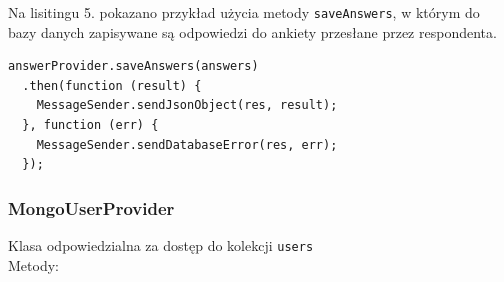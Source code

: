 \documentclass[8pt,a4paper,notitlepage]{article}
\begin{document}
\par Na lisitingu 5. pokazano przykład użycia metody \texttt{saveAnswers}, w którym do bazy danych zapisywane są odpowiedzi do ankiety przesłane przez respondenta.

\begin{lstlisting}[caption=Przykład użycia metody \texttt{saveAnswers} ]
answerProvider.saveAnswers(answers)
  .then(function (result) {
    MessageSender.sendJsonObject(res, result);
  }, function (err) {
    MessageSender.sendDatabaseError(res, err);
  });
\end{lstlisting}

\newpage
\subsubsection{MongoUserProvider}
Klasa odpowiedzialna za dostęp do kolekcji \texttt{users} \\ 
Metody:
\end{document}
